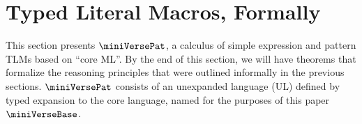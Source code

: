 \documentclass[acmsmall]{acmart}
\begin{document}
\begin{comment}
\end{comment}

\section{Typed Literal Macros, Formally}
\label{sec:setlms-formally}

This section presents  $\miniVersePat$, a calculus of simple expression and pattern TLMs based on ``core ML''. By the end of this section, we will have theorems that formalize the reasoning principles that were outlined informally in the previous sections. $\miniVersePat$ consists of an {unexpanded language} ({UL}) defined by typed expansion to the core language, named for the purposes of this paper $\miniVerseBase$. 
\end{document}
